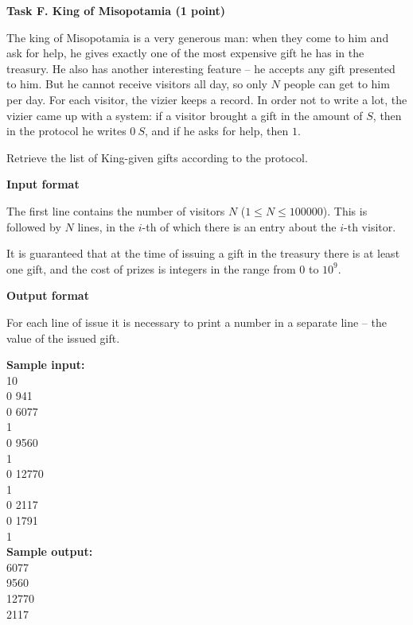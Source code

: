 \documentclass[a4paper]{article}
\begin{document}
\textbf{Task F. King of Misopotamia (1 point)}

\SPACE

The king of Misopotamia is a very generous man: when they come to him and ask for help, he gives exactly one of the most expensive gift he has in the treasury. He also has another interesting feature -- he accepts any gift presented to him. But he cannot receive visitors all day, so only $N$ people can get to him per day. For each visitor, the vizier keeps a record. In order not to write a lot, the vizier came up with a system: if a visitor brought a gift in the amount of $S$, then in the protocol he writes $0 \ S$, and if he asks for help, then $1$.

Retrieve the list of King-given gifts according to the protocol.

\SPACE

\textbf{Input format}

The first line contains the number of visitors $N$ ($1 \le N \le 100000$). This is followed by $N$ lines, in the $i$-th of which there is an entry about the $i$-th visitor.

It is guaranteed that at the time of issuing a gift in the treasury there is at least one gift, and the cost of prizes is integers in the range from $0$ to $10^9$.

\SPACE

\textbf{Output format}

For each line of issue it is necessary to print a number in a separate line -- the value of the issued gift.

\SPACE

\noindent \textbf{Sample input:}\\
10\\
0 941\\
0 6077\\
1\\
0 9560\\
1\\
0 12770\\
1\\
0 2117\\
0 1791\\
1\\


\noindent \textbf{Sample output:}\\
6077\\
9560\\
12770\\
2117\\
\end{document}
